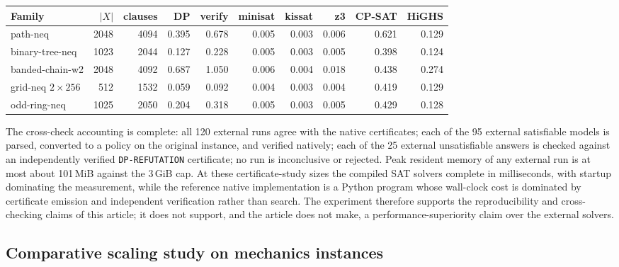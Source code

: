 \documentclass[11pt]{article}
\theoremstyle{plain}
\theoremstyle{definition}
\theoremstyle{remark}
\begin{document}
\begin{center}
\begin{tabular}{@{}lrrrrrrrrr@{}}
\toprule
Family & $|X|$ & clauses & DP & verify & minisat & kissat & z3 & CP-SAT & HiGHS\\
\midrule
path-neq & 2048 & 4094 & 0.395 & 0.678 & 0.005 & 0.003 & 0.006 & 0.621 & 0.129\\
binary-tree-neq & 1023 & 2044 & 0.127 & 0.228 & 0.005 & 0.003 & 0.005 & 0.398 & 0.124\\
banded-chain-w2 & 2048 & 4092 & 0.687 & 1.050 & 0.006 & 0.004 & 0.018 & 0.438 & 0.274\\
grid-neq $2\times 256$ & 512 & 1532 & 0.059 & 0.092 & 0.004 & 0.003 & 0.004 & 0.419 & 0.129\\
odd-ring-neq & 1025 & 2050 & 0.204 & 0.318 & 0.005 & 0.003 & 0.005 & 0.429 & 0.128\\
\bottomrule
\end{tabular}
\label{tab:external-baselines}
\end{center}

The cross-check accounting is complete: all 120 external runs agree with the
native certificates; each of the 95 external satisfiable models is parsed,
converted to a policy on the original instance, and verified natively; each of
the 25 external unsatisfiable answers is checked against an independently
verified \texttt{DP-REFUTATION} certificate; no run is inconclusive or
rejected.  Peak resident memory of any external run is at most about
101\,MiB against the 3\,GiB cap.  At these certificate-study sizes the
compiled SAT solvers complete in milliseconds, with startup dominating the
measurement, while the reference native implementation is a Python program
whose wall-clock cost is dominated by certificate emission and independent
verification rather than search.  The experiment therefore supports the
reproducibility and cross-checking claims of this article; it does not support,
and the article does not make, a performance-superiority claim over the
external solvers.

\subsection{Comparative scaling study on mechanics instances}
\label{subsec:mechanics-baselines}
\end{document}
